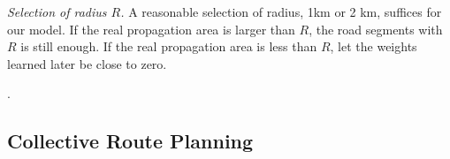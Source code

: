 {\em Selection of radius $R$.} A reasonable selection of radius, \eg 1km or 2 km, suffices for our model. If the real propagation area is larger than $R$, the road segments with $R$ is still enough. If the real propagation area is less than $R$, let the weights learned later be close to zero.

.



\subsection{Collective Route Planning}
\label{subsec-route}

